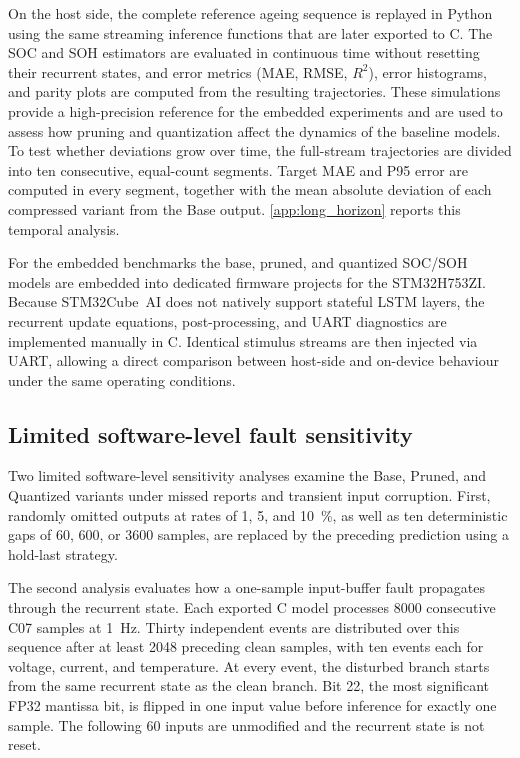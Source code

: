 \documentclass[review]{elsarticle}
\begin{document}
On the host side, the complete reference ageing sequence is replayed in Python using the same streaming inference functions that are later exported to C. The SOC and SOH estimators are evaluated in continuous time without resetting their recurrent states, and error metrics (MAE, RMSE, $R^2$), error histograms, and parity plots are computed from the resulting trajectories. These simulations provide a high-precision reference for the embedded experiments and are used to assess how pruning and quantization affect the dynamics of the baseline models. To test whether deviations grow over time, the full-stream trajectories are divided into ten consecutive, equal-count segments. Target MAE and P95 error are computed in every segment, together with the mean absolute deviation of each compressed variant from the Base output. \ref{app:long_horizon} reports this temporal analysis.

For the embedded benchmarks the base, pruned, and quantized SOC/SOH models are embedded into dedicated firmware projects for the STM32H753ZI. Because STM32Cube~AI does not natively support stateful LSTM layers, the recurrent update equations, post-processing, and UART diagnostics are implemented manually in C. Identical stimulus streams are then injected via UART, allowing a direct comparison between host-side and on-device behaviour under the same operating conditions.

\subsection{Limited software-level fault sensitivity}
Two limited software-level sensitivity analyses examine the Base, Pruned, and Quantized variants under missed reports and transient input corruption. First, randomly omitted outputs at rates of 1, 5, and 10~\%, as well as ten deterministic gaps of 60, 600, or 3600 samples, are replaced by the preceding prediction using a hold-last strategy.

The second analysis evaluates how a one-sample input-buffer fault propagates through the recurrent state. Each exported C model processes 8000 consecutive C07 samples at 1~Hz. Thirty independent events are distributed over this sequence after at least 2048 preceding clean samples, with ten events each for voltage, current, and temperature. At every event, the disturbed branch starts from the same recurrent state as the clean branch. Bit 22, the most significant FP32 mantissa bit, is flipped in one input value before inference for exactly one sample. The following 60 inputs are unmodified and the recurrent state is not reset.
\end{document}
